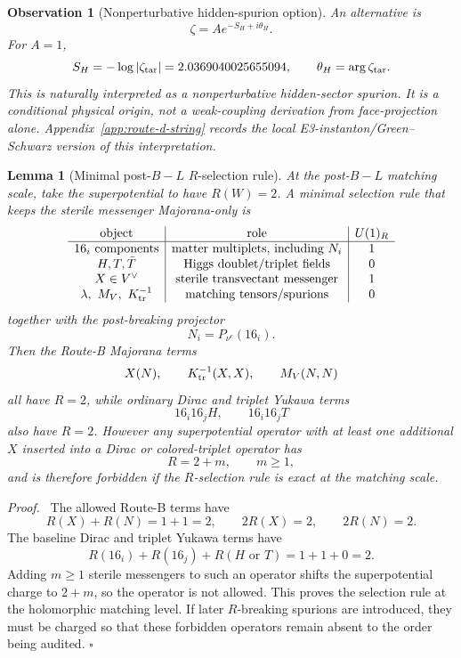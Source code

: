 \documentclass[
  aps,
  prd,
  preprint,
  nofootinbib,
  superscriptaddress,
  longbibliography
]{revtex4-2}
\newtheorem{lemma}[theorem]{Lemma}
\newtheorem{observation}[theorem]{Observation}
\newenvironment{proof}{\par\noindent\textit{Proof.}\ }{\hfill\(\square\)\par}
\begin{document}
\begin{observation}[Nonperturbative hidden-spurion option]
An alternative is
\[
  \zeta=Ae^{-S_H+i\theta_H}.
\]
For \(A=1\),
\[
  S_H=-\log|\zeta_{\rm tar}|=2.0369040025655094,\qquad
  \theta_H=\arg\zeta_{\rm tar}.
\]
This is naturally interpreted as a nonperturbative hidden-sector spurion.  It
is a conditional physical origin, not a weak-coupling derivation from
face-projection alone.  Appendix~\ref{app:route-d-string} records the local
E3-instanton/Green--Schwarz version of this interpretation.
\end{observation}

\begin{lemma}[Minimal post-\(B-L\) \(R\)-selection rule]
\label{lem:routeb-r-selection}
At the post-\(B-L\) matching scale, take the superpotential to have
\(R(W)=2\).  A minimal selection rule that keeps the sterile messenger
Majorana-only is
\[
\begin{array}{c|c|c}
\text{object} & \text{role} & U(1)_R\\
\hline
16_i\text{ components} & \text{matter multiplets, including }N_i & 1\\
H,T,\bar T & \text{Higgs doublet/triplet fields} & 0\\
X\in V^\vee & \text{sterile transvectant messenger} & 1\\
\lambda,\ M_V,\ K_{\rm tr}^{-1} & \text{matching tensors/spurions} & 0
\end{array}
\]
together with the post-breaking projector
\[
  N_i=P_{\nu^c}(16_i).
\]
Then the Route-B Majorana terms
\[
  X(N),\qquad K_{\rm tr}^{-1}(X,X),\qquad M_V(N,N)
\]
all have \(R=2\), while ordinary Dirac and triplet Yukawa terms
\[
  16_i16_jH,\qquad 16_i16_jT
\]
also have \(R=2\).  However any superpotential operator with at least one
additional \(X\) inserted into a Dirac or colored-triplet operator has
\[
  R=2+m,\qquad m\ge1,
\]
and is therefore forbidden if the \(R\)-selection rule is exact at the
matching scale.
\end{lemma}

\begin{proof}
The allowed Route-B terms have
\[
  R(X)+R(N)=1+1=2,\qquad
  2R(X)=2,\qquad
  2R(N)=2.
\]
The baseline Dirac and triplet Yukawa terms have
\[
  R(16_i)+R(16_j)+R(H\text{ or }T)=1+1+0=2.
\]
Adding \(m\ge1\) sterile messengers to such an operator shifts the
superpotential charge to \(2+m\), so the operator is not allowed.  This proves
the selection rule at the holomorphic matching level.  If later \(R\)-breaking
spurions are introduced, they must be charged so that these forbidden
operators remain absent to the order being audited.
\end{proof}
\end{document}

